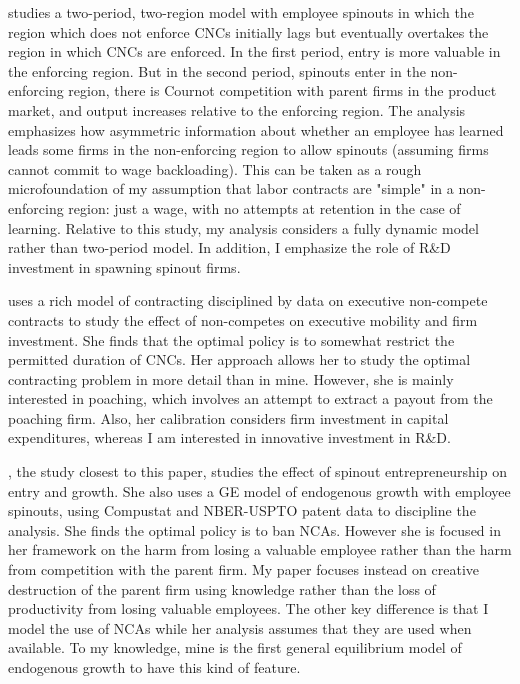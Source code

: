 \documentclass[11pt,english]{article}
\begin{document}
\cite{franco_covenants_2008} studies a two-period, two-region model with employee spinouts in which the region which does not enforce CNCs initially lags but eventually overtakes the region in which CNCs are enforced. In the first period, entry is more valuable in the enforcing region. But in the second period, spinouts enter in the non-enforcing region, there is Cournot competition with parent firms in the product market, and output increases relative to the enforcing region. The analysis emphasizes how asymmetric information about whether an employee has learned leads some firms in the non-enforcing region to allow spinouts (assuming firms cannot commit to wage backloading). This can be taken as a rough microfoundation of my assumption that labor contracts are "simple" in  a non-enforcing region: just a wage, with no attempts at retention in the case of learning. Relative to this study, my analysis considers a fully dynamic model rather than two-period model. In addition, I emphasize the role of R\&D investment in spawning spinout firms.

\cite{shi_restrictions_2018} uses a rich model of contracting disciplined by data on executive non-compete contracts to study the effect of non-competes on executive mobility and firm investment. She finds that the optimal policy is to somewhat restrict the permitted duration of CNCs. Her approach allows her to study the optimal contracting problem in more detail than in mine. However, she is mainly interested in poaching, which involves an attempt to extract a payout from the poaching firm. Also, her calibration considers firm investment in capital expenditures, whereas I am interested in innovative investment in R\&D.

\cite{baslandze_spinout_2019}, the study closest to this paper, studies the effect of spinout entrepreneurship on entry and growth. She also uses a GE model of endogenous growth with employee spinouts, using Compustat and NBER-USPTO patent data to discipline the analysis. She finds the optimal policy is to ban NCAs. However she is focused in her framework on the harm from losing a valuable employee rather than the harm from competition with the parent firm. My paper focuses instead on creative destruction of the parent firm using knowledge rather than the loss of productivity from losing valuable employees.  The other key difference is that I model the use of NCAs while her analysis assumes that they are used when available. To my knowledge, mine is the first general equilibrium model of endogenous growth to have this kind of feature.
\end{document}
